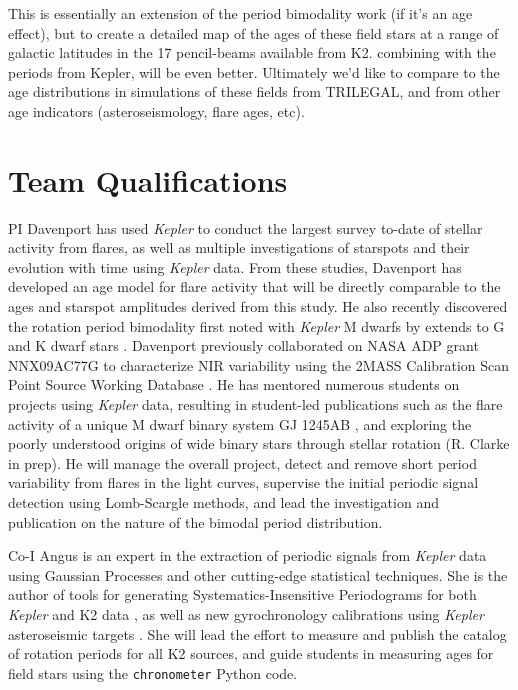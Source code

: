 \documentclass[12pt]{article}
\newcommand{\Kepler}{\textsl{Kepler}\xspace}
\begin{document}
This is essentially an extension of the period bimodality work (if it's an age
effect), but to create a detailed map of the ages of these field stars at a
range of galactic latitudes in the 17 pencil-beams available from K2.
combining with the periods from Kepler, will be even better.
Ultimately we'd like to compare to the age distributions in simulations of
these fields from TRILEGAL, and from other age indicators (asteroseismology,
flare ages, etc).

\section{Team Qualifications}
PI Davenport has used \Kepler to conduct the largest survey to-date of stellar activity from flares, as well as multiple investigations of starspots and their evolution with time using \Kepler data. From these studies, Davenport has developed an age model for flare activity that will be directly comparable to the ages and starspot amplitudes derived from this study. He also recently discovered the rotation period bimodality first noted with \Kepler M dwarfs by \citet{mcquillan2013} extends to G and K dwarf stars \citep{davenport2017}.
Davenport previously collaborated on NASA ADP grant NNX09AC77G to characterize NIR variability using the 2MASS Calibration Scan Point Source Working Database \citep{davenport2012,davenport2015a}.
He has mentored numerous students on projects using \Kepler data, resulting in student-led publications such as the flare activity of a unique M dwarf binary system GJ 1245AB \citep{lurie2015}, and exploring the poorly understood origins of wide binary stars through stellar rotation (R. Clarke in prep). He will manage the overall project, detect and remove short period variability from flares in the light curves, supervise the initial periodic signal detection using Lomb-Scargle methods, and lead the investigation and publication on the nature of the bimodal period distribution.

Co-I Angus is an expert in the extraction of periodic signals from \Kepler data using Gaussian Processes \citep{angus2016c} and other cutting-edge statistical techniques. She is the author of tools for generating Systematics-Insensitive Periodograms for both \Kepler and K2 data \citep{angus2016}, as well as new gyrochronology calibrations using \Kepler asteroseismic targets \citep{angus2015}. She will lead the effort to measure and publish the catalog of rotation periods for all K2 sources, and guide students in measuring ages for field stars using the {\tt chronometer} Python code.
\end{document}
